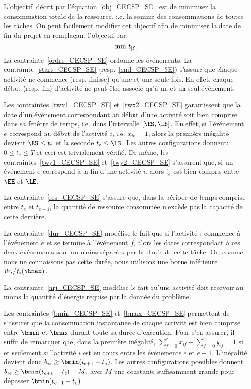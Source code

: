 L'objectif, décrit par l'équation~\eqref{obj_CECSP_SE}, est de
minimiser la consommation totale de la ressource, i.e. la somme des
consommations de toutes les tâches. On peut facilement modifier cet
objectif afin de minimiser la date de fin du projet en remplaçant
l'objectif par:
\begin{equation}
\text{min } t_{|{\cal E}|} \notag
\end{equation}
La contrainte~\eqref{ordre_CECSP_SE} ordonne les événements. La
contrainte~\eqref{start_CECSP_SE} (resp.~\eqref{end_CECSP_SE})
s'assure que chaque activité ne commence (resp. finisse) qu'une et une
seule fois. En effet, chaque début (resp. fin) d'activité ne peut être
associé qu'à un et un seul événement.
 
Les contraintes~\eqref{twx1_CECSP_SE} et~\eqref{twx2_CECSP_SE}
garantissent que la date d'un événement correspondant au début d'une
activité soit bien comprise dans sa fenêtre de temps, i.e. dans
l'intervalle $[\ES,\LS]$. En effet, si l'événement $e$ correspond au
début de l'activité $i$, i.e. $x_{ie}=1$, alors la première inégalité
devient $\ES \le t_e$ et la seconde $t_e \le \LS$. Les autres
configurations donnent: $0 \le t_e \le T$ et ceci est trivialement
vérifié. De même, les contraintes~\eqref{twy1_CECSP_SE}
et~\eqref{twy2_CECSP_SE} s'assurent que, si un événement $e$
correspond à la fin d'une activité $i$, alors $t_e$ est bien compris
entre $\EE$ et $\LE$.

La contrainte~\eqref{res_CECSP_SE} s'assure que, dans la période de
temps comprise entre $t_e$ et $t_{e+1}$, la quantité de ressource
consommée n’excède pas la capacité de cette dernière.

La contrainte~\eqref{dur_CECSP_SE} modélise le fait que si l'activité
$i$ commence à l'événement $e$ et se termine à l'événement $f$, alors
les dates correspondant à ces deux événements sont au moins séparées
par la durée de cette tâche. Or, comme nous ne connaissons pas cette
durée, nous utilisons une borne inférieure: $W_i/f_i(\bmax)$. 

La contrainte~\eqref{nrj_CECSP_SE} modélise le fait qu'une activité
doit recevoir au moins la quantité d'énergie requise par la donnée du
problème.

Les contraintes~\eqref{bmin_CECSP_SE} et~\eqref{bmax_CECSP_SE}
permettent de s'assurer que la consommation instantanée de chaque
activité est bien comprise entre $\bmin$ et $\bmax$ durant toute sa
durée d'exécution. Pour s'en assurer, il suffit de remarquer que, dans
la première inégalité, $\sum_{f=0}^{e} x_{if}-\sum_{f=0}^{e}y_{if}=1$
si et seulement si l'activité $i$ est en cours entre les événements
$e$ et $e+1$.  L'inégalité devient donc $b_{ie} \ge
\bmin(t_{e+1}-t_e)$. Les autres configurations possibles donnent
$b_{ie} \ge \bmin(t_{e+1}-t_e)-M$, avec $M$ une constante
suffisamment grande pour dépasser $\bmin(t_{e+1}-t_e)$.


